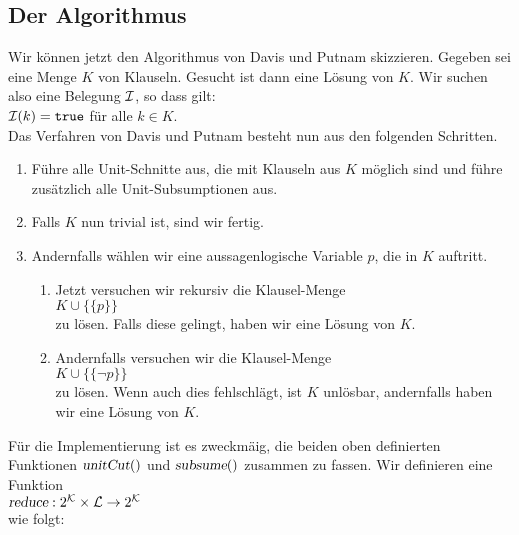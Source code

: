 \subsection{Der Algorithmus}
Wir k\"{o}nnen jetzt den Algorithmus von Davis und Putnam skizzieren.
Gegeben sei eine Menge $K$ von Klauseln.  Gesucht ist dann eine L\"{o}sung von $K$.  Wir
suchen  also eine Belegung $\mathcal{I}$, so dass gilt: \\[0.2cm]
\hspace*{1.3cm} $\mathcal{I}(k) = \mathtt{true}$ \quad f\"{u}r alle $k \in K$.\\[0.2cm]
Das Verfahren von Davis und Putnam besteht nun aus den folgenden Schritten.
\begin{enumerate}
\item F\"{u}hre alle Unit-Schnitte aus, die mit Klauseln aus $K$ m\"{o}glich sind und f\"{u}hre
      zus\"{a}tzlich alle Unit-Subsumptionen aus.
\item Falls $K$ nun trivial ist, sind wir fertig.
\item Andernfalls w\"{a}hlen wir eine aussagenlogische Variable $p$, die in $K$ auftritt.
      \begin{enumerate}
      \item Jetzt versuchen  wir rekursiv  die Klausel-Menge \\[0.2cm]
            \hspace*{1.3cm}  $K \cup \bigl\{\{p\}\bigr\}$ \\[0.2cm]
            zu l\"{o}sen. Falls diese gelingt, haben wir eine L\"{o}sung von $K$.
      \item Andernfalls versuchen wir  die Klausel-Menge \\[0.2cm]
            \hspace*{1.3cm} $K \cup \bigl\{\{\neg p\}\bigr\}$ \\[0.2cm]
            zu l\"{o}sen.  Wenn auch dies fehlschl\"{a}gt, ist $K$ unl\"{o}sbar, andernfalls
            haben wir eine L\"{o}sung von $K$.
      \end{enumerate}
\end{enumerate}
F\"{u}r die Implementierung ist es zweckm\"{a}\3ig, die beiden oben definierten Funktionen $\textsl{unitCut}()$ und
$\textsl{subsume}()$ zusammen zu fassen.  Wir definieren eine Funktion
\\[0.2cm]
\hspace*{1.3cm}
$\textsl{reduce}: 2^\mathcal{K} \times \mathcal{L} \rightarrow 2^\mathcal{K}$
\\[0.2cm]
wie folgt: 
\\[0.2cm]
